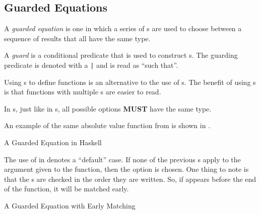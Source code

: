 \subsection{Guarded Equations}\label{subsec:Guarded_Equations}
\begin{definition}\label{def:Guarded_Equation}
  A \emph{guarded equation} is one in which a series of s are used to choose between a sequence of results that all have the same type.
\end{definition}

\begin{definition}[Guard]\label{def:Guard}
  A \emph{guard} is a conditional predicate that is used to construct s.
  The guarding predicate is denoted with a \texttt{|} and is read as ``such that''.
\end{definition}

Using s to define functions is an alternative to the use of s.
The benefit of using s is that functions with multiple s are easier to read.

\begin{blackbox}
  In s, just like in s, all possible options \textbf{MUST} have the same type.
\end{blackbox}

An example of the same absolute value function from  is shown in .
\begin{listing}[h!tbp]
\caption{A Guarded Equation in Haskell}
\label{lst:Guarded_Equation}
\end{listing}

The use of  in  denotes a ``default'' case.
If none of the previous s apply to the argument given to the function, then the  option is chosen.
One thing to note is that the s are checked in the order they are written.
So, if  appears before the end of the function, it will be matched early.
\begin{listing}[h!tbp]
\caption{A Guarded Equation with Early Matching}
\label{lst:Guarded_Equation_Early_Match}
\end{listing}

